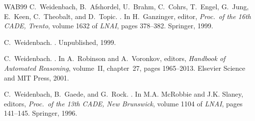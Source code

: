 \documentclass{report}
\begin{document}
\begin{thebibliography}{WAB{\etalchar{+}}99}
C.~Weidenbach, B.~Afshordel, U.~Brahm, C.~Cohrs, T.~Engel, G.~Jung, E.~Keen,
  C.~Theobalt, and D.~Topic.
.
\newblock In H.~Ganzinger, editor, {\em Proc.\ of the 16th CADE, Trento},
  volume 1632 of {\em LNAI}, pages 378--382. Springer, 1999.

C.~Weidenbach.
.
\newblock Unpublished, 1999.

C.~Weidenbach.
.
\newblock In A.~Robinson and A.~Voronkov, editors, {\em Handbook of Automated
  Reasoning}, volume~II, chapter~27, pages 1965--2013. Elsevier Science and MIT
  Press, 2001.

C.~Weidenbach, B.~Gaede, and G.~Rock.
.
\newblock In M.A. McRobbie and J.K. Slaney, editors, {\em Proc.\ of the 13th
  CADE, New Brunswick}, volume 1104 of {\em LNAI}, pages 141--145. Springer,
  1996.

\end{thebibliography}

\printindex
\end{document}
